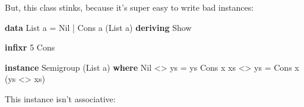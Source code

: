 \documentclass[]{article}
\newenvironment{Shaded}{}{}
\newcommand{\DataTypeTok}[1]{\textcolor[rgb]{0.56,0.13,0.00}{#1}}
\newcommand{\DecValTok}[1]{\textcolor[rgb]{0.25,0.63,0.44}{#1}}
\newcommand{\KeywordTok}[1]{\textcolor[rgb]{0.00,0.44,0.13}{\textbf{#1}}}
\newcommand{\NormalTok}[1]{#1}
\newcommand{\OperatorTok}[1]{\textcolor[rgb]{0.40,0.40,0.40}{#1}}
\newcommand{\OtherTok}[1]{\textcolor[rgb]{0.00,0.44,0.13}{#1}}
\begin{document}
But, this class stinks, because it's super easy to write bad instances:

\begin{Shaded}
\begin{Highlighting}[]
\KeywordTok{data} \DataTypeTok{List}\NormalTok{ a }\OtherTok{=} \DataTypeTok{Nil} \OperatorTok{|} \DataTypeTok{Cons}\NormalTok{ a (}\DataTypeTok{List}\NormalTok{ a)}
    \KeywordTok{deriving} \DataTypeTok{Show}

\KeywordTok{infixr} \DecValTok{5} \OtherTok{\textasciigrave{}Cons\textasciigrave{}}

\KeywordTok{instance} \DataTypeTok{Semigroup}\NormalTok{ (}\DataTypeTok{List}\NormalTok{ a) }\KeywordTok{where}
    \DataTypeTok{Nil}       \OperatorTok{<>}\NormalTok{ ys }\OtherTok{=}\NormalTok{ ys}
    \DataTypeTok{Cons}\NormalTok{ x xs }\OperatorTok{<>}\NormalTok{ ys }\OtherTok{=} \DataTypeTok{Cons}\NormalTok{ x (ys }\OperatorTok{<>}\NormalTok{ xs)}
\end{Highlighting}
\end{Shaded}

This instance isn't associative:
\end{document}
